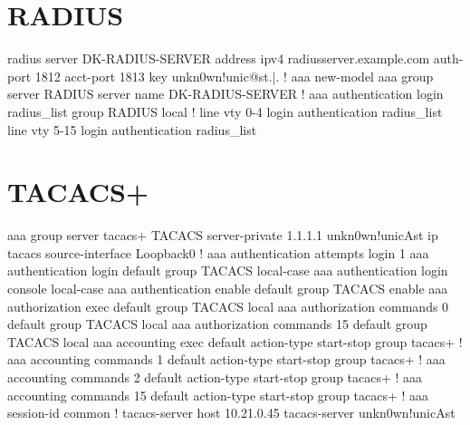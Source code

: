 \newpage

\section{RADIUS}


\begin{txt}
radius server DK-RADIUS-SERVER
 address ipv4 radiusserver.example.com auth-port 1812 acct-port 1813
 key unkn0wn!unic@st.|.
!
aaa new-model
aaa group server RADIUS
 server name DK-RADIUS-SERVER
!
aaa authentication login radius_list group RADIUS local
!
line vty 0-4
 login authentication radius_list
line vty 5-15
 login authentication radius_list
\end{txt}

\newpage

\section{TACACS+}


\begin{txt}
aaa group server tacacs+ TACACS
server-private 1.1.1.1 unkn0wn!unicAst
ip tacacs source-interface Loopback0
!
aaa authentication attempts login 1
aaa authentication login default group TACACS local-case
aaa authentication login console local-case
aaa authentication enable default group TACACS enable
aaa authorization exec default group TACACS local 
aaa authorization commands 0 default group TACACS local 
aaa authorization commands 15 default group TACACS local 
aaa accounting exec default
 action-type start-stop
 group tacacs+
!
aaa accounting commands 1 default
 action-type start-stop
 group tacacs+
!
aaa accounting commands 2 default
 action-type start-stop
 group tacacs+
!
aaa accounting commands 15 default
 action-type start-stop
 group tacacs+
!
aaa session-id common
!
tacacs-server host 10.21.0.45
tacacs-server unkn0wn!unicAst
\end{txt}
